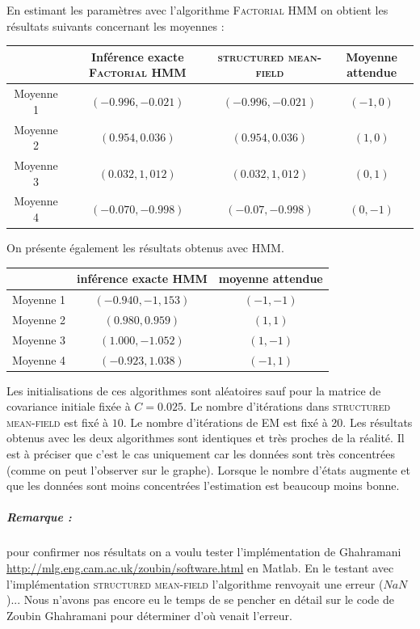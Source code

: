 \documentclass[10pt,a4paper]{article}
\newcommand{\hmm}{\textsc{HMM}}
\newcommand{\fhmm}{\textsc{Factorial HMM}}
\newcommand{\EM}{\textsc{EM}}
\newcommand{\structmeanfield}{\textsc{structured mean-field}}
\begin{document}
En estimant les paramètres avec l'algorithme \fhmm{} on obtient les résultats
suivants concernant les moyennes : 

\begin{center}
 \begin{tabular}{|c|c|c|c|} 
 \hline
 & Inférence exacte \fhmm{} & \structmeanfield{} & Moyenne attendue  \\ \hline \hline
 Moyenne 1 & $(-0.996,-0.021)$ & $(-0.996,-0.021)$&$(-1,0)$ \\ \hline
 Moyenne 2 &  $(0.954,0.036)$ &  $(0.954,0.036)$ & $(1,0)$ \\ \hline
 Moyenne 3 & $(0.032,1,012)$ & $(0.032,1,012)$ & $(0,1)$ \\ \hline
 Moyenne 4 & $(-0.070,-0.998)$ & $(-0.07,-0.998)$ &  $(0,-1)$ \\ \hline
 \end{tabular}
\end{center}
On présente également les résultats obtenus avec \hmm{}.
\begin{center}
\begin{tabular}{|c|c|c|}
\hline
& inférence exacte \hmm{} & moyenne attendue \\ \hline \hline
Moyenne 1 & $(-0.940,-1,153)$ & $(-1,-1)$ \\ \hline
Moyenne 2 &$(0.980,0.959)$ & $(1,1)$\\ \hline
Moyenne 3 & $(1.000, -1.052)$ & $(1,-1)$\\ \hline
Moyenne 4 & $(-0.923,1.038)$ & $(-1,1)$\\ \hline
\end{tabular}
\end{center}

Les initialisations de ces algorithmes sont aléatoires sauf pour la matrice de
covariance initiale fixée à $C= 0.025$.
Le nombre d'itérations dans \structmeanfield{} est fixé à $10$.
Le nombre d'itérations de \EM{} est fixé à 20.
Les résultats obtenus avec les deux algorithmes sont identiques et très proches
de la réalité.
Il est à préciser que c'est le cas uniquement car les données sont très
concentrées (comme on peut l'observer sur le graphe).
Lorsque le nombre d'états augmente et que les données sont moins concentrées
l'estimation est beaucoup moins bonne.

\subparagraph{Remarque :} pour confirmer nos résultats on a voulu tester
l'implémentation de Ghahramani
\url{http://mlg.eng.cam.ac.uk/zoubin/software.html} en Matlab.
En le testant avec l'implémentation \structmeanfield{} l'algorithme renvoyait
une erreur ($NaN$)...
Nous n'avons pas encore eu le temps de se pencher en détail sur le code de
Zoubin Ghahramani pour déterminer d'où venait l'erreur.
\end{document}
